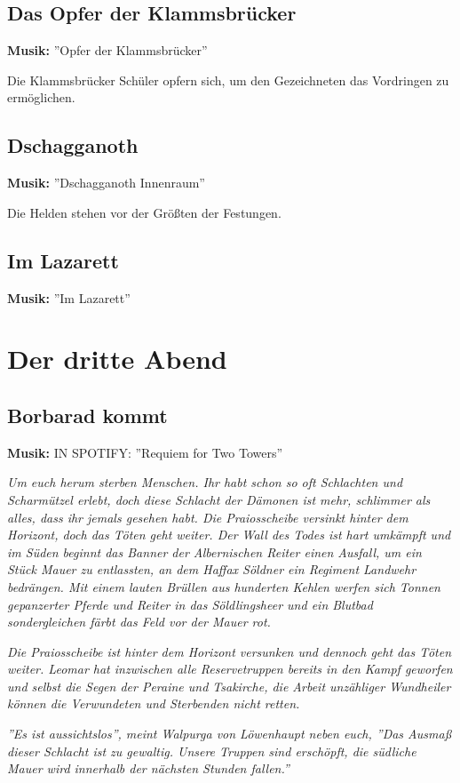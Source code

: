\subsection{Das Opfer der Klammsbrücker}
\textbf{Musik:} ''Opfer der Klammsbrücker''

Die Klammsbrücker Schüler opfern sich, um den Gezeichneten das Vordringen zu ermöglichen.

\subsection{Dschagganoth}
\textbf{Musik:} ''Dschagganoth Innenraum''
 
Die Helden stehen vor der Größten der Festungen.

\subsection{Im Lazarett}
\textbf{Musik:} ''Im Lazarett''

\section{Der dritte Abend}

\subsection{Borbarad kommt}
\textbf{Musik:} IN SPOTIFY: ''Requiem for Two Towers''
 

\emph{Um euch herum sterben Menschen. Ihr habt schon so oft Schlachten und Scharmützel erlebt, doch diese Schlacht der Dämonen ist mehr, schlimmer als alles, dass ihr jemals gesehen habt. Die Praiosscheibe versinkt hinter dem Horizont, doch das Töten geht weiter. Der Wall des Todes ist hart umkämpft und im Süden beginnt das Banner der Albernischen Reiter einen Ausfall, um ein Stück Mauer zu entlassten, an dem Haffax Söldner ein Regiment Landwehr bedrängen. Mit einem lauten Brüllen aus hunderten Kehlen werfen sich Tonnen gepanzerter Pferde und Reiter in das Söldlingsheer und ein Blutbad sondergleichen färbt das Feld vor der Mauer rot.}

\emph{Die Praiosscheibe ist hinter dem Horizont versunken und dennoch geht das Töten weiter. Leomar hat inzwischen alle Reservetruppen bereits in den Kampf geworfen und selbst die Segen der Peraine und Tsakirche, die Arbeit unzähliger Wundheiler können die Verwundeten und Sterbenden nicht retten.}

\emph{''Es ist aussichtslos'', meint Walpurga von Löwenhaupt neben euch, ''Das Ausmaß dieser Schlacht ist zu gewaltig. Unsere Truppen sind erschöpft, die südliche Mauer wird innerhalb der nächsten Stunden fallen.''}

